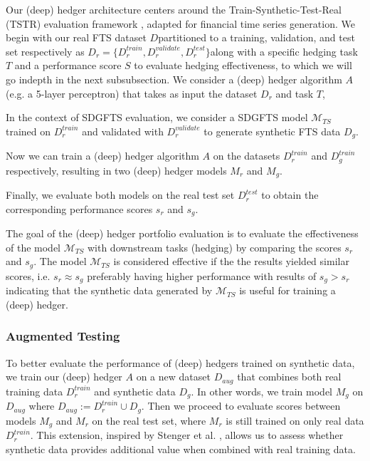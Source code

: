       Our (deep) hedger architecture centers around the 
      Train-Synthetic-Test-Real (TSTR) evaluation framework 
      \cite{Leznik21}, adapted for financial time series 
      generation. We begin with our real FTS dataset 
      \( D\)\textemdash partitioned to a training, validation, 
      and test set respectively as
      \( D_r = \{D_r^{train}, D_r^{validate}, D_r^{test}\} 
      \)\textemdash along with a specific hedging task \(T\) and a 
      performance score \(S\) to evaluate hedging effectiveness, to 
      which we will go indepth in the next subsubsection.
      We consider a (deep) hedger algorithm \(A\) (e.g. a 5-layer 
      perceptron) that takes as input the dataset \(D_r\) and 
      task \(T\),

      In the context of SDGFTS evaluation, we consider a SDGFTS 
      model \( \mathcal{M}_{TS} \) trained on \( D_r^{train} \) 
      and validated with \( D_r^{validate} \) to generate synthetic 
      FTS data \( D_g \).

      Now we can train a (deep) hedger algorithm \( A \) on the 
      datasets \( D_r^{train} \) and \( D_g^{train} \) 
      respectively, resulting in two (deep) hedger models
      \( M_r \) and \( M_g \).

      Finally, we evaluate both models on the real test set 
      \( D_r^{test} \) to obtain the corresponding performance 
      scores \( s_r \) and \( s_g \).

      The goal of the (deep) hedger portfolio evaluation is to 
      evaluate the effectiveness of the model 
      \( \mathcal{M}_{TS} \) with downstream tasks (hedging) 
      by comparing the scores \( s_r \) and \( s_g \). The model 
      \( \mathcal{M}_{TS} \) is considered effective if the 
      the results yielded similar scores, i.e. 
      \( s_r \approx s_g \) \textemdash preferably having higher 
      performance with results of \( s_g > s_r \) \textemdash 
      indicating that the synthetic data generated by 
      \( \mathcal{M}_{TS} \) is useful for training a (deep) hedger.

      \subsubsection{Augmented Testing}
      \label{sec:augmented-testing}
      To better evaluate the performance of (deep) hedgers trained 
      on synthetic data, we train our (deep) hedger \( A \) on a 
      new dataset \( D_{aug} \) that combines both real training 
      data \( D_r^{train} \) and synthetic data \( D_g\). In 
      other words, we train model \( M_g \) on \( D_{aug} \) 
      where \( D_{aug} := D_r^{train} \cup D_g\).
      Then we proceed to evaluate scores between models
      \( M_g \) and \( M_r \) on the real test set, where 
      \( M_r \) is still trained on only real data 
      \( D_r^{train} \).
      This extension, inspired by Stenger et al. \cite{Stenger24}, 
      allows us to assess whether synthetic data provides additional 
      value when combined with real training data.


